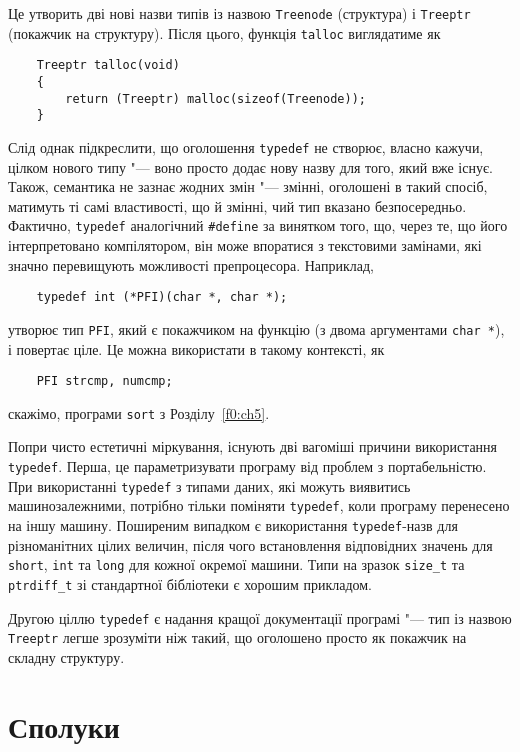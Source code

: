 \documentclass[a4paper,12pt]{book}
\begin{document}
  Це утворить дві нові назви типів із назвою \texttt{Treenode} (структура) і
  \texttt{Treeptr} (покажчик на структуру). Після цього, функція \texttt{talloc}
  виглядатиме як
  \begin{verbatim}
    Treeptr talloc(void)
    {
        return (Treeptr) malloc(sizeof(Treenode));
    }
  \end{verbatim}

  Слід однак підкреслити, що оголошення \texttt{typedef} не створює, власно кажучи, цілком
  нового типу "--- воно просто додає нову назву для того, який вже існує. Також,
  семантика не зазнає жодних змін "--- змінні, оголошені в такий спосіб, матимуть ті
  самі властивості, що й змінні, чий тип вказано безпосередньо. Фактично, \texttt{typedef}
  аналогічний \texttt{\#define} за винятком того, що, через те, що його інтерпретовано
  компілятором, він може впоратися з текстовими замінами, які значно перевищують
  можливості препроцесора. Наприклад,
  \begin{verbatim}
    typedef int (*PFI)(char *, char *);
  \end{verbatim}
  утворює тип \texttt{PFI}, який є покажчиком на функцію (з двома аргументами \texttt{char
  *}), і повертає ціле. Це можна використати в такому контексті, як
  \begin{verbatim}
    PFI strcmp, numcmp;
  \end{verbatim}
  скажімо, програми \texttt{sort} з Розділу~\ref{f0:ch5}.

  Попри чисто естетичні міркування, існують дві вагоміші причини використання
  \texttt{typedef}. Перша, це параметризувати програму від проблем з портабельністю. При
  використанні \texttt{typedef} з типами даних, які можуть виявитись машинозалежними,
  потрібно тільки поміняти \texttt{typedef}, коли програму перенесено на іншу машину.
  Поширеним випадком є використання \texttt{typedef}-назв для різноманітних цілих величин,
  після чого встановлення відповідних значень для \texttt{short}, \texttt{int} та
  \texttt{long} для кожної окремої машини. Типи на зразок \texttt{size\_t} та
  \texttt{ptrdiff\_t} зі стандартної бібліотеки є хорошим прикладом.

  Другою ціллю \texttt{typedef} є надання кращої документації програмі "--- тип із назвою
  \texttt{Treeptr} легше зрозуміти ніж такий, що оголошено просто як покажчик на складну
  структуру.

\section{Сполуки}
\end{document}
